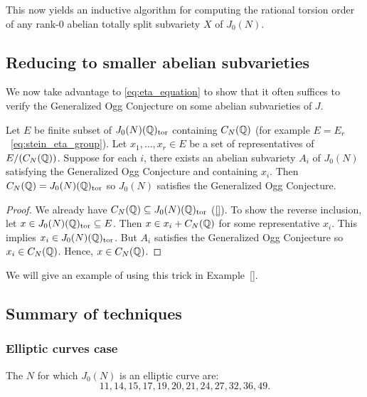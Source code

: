 This now yields an inductive algorithm for computing the rational torsion order
of any rank-0 abelian totally split subvariety $X$ of $J_0(N)$.

\subsection{Reducing to smaller abelian subvarieties}%
\label{sub:reducing_to_smaller_abelian_subvarieties}

We now take advantage to \eqref{eq:eta_equation} to show that it often suffices
to verify the Generalized Ogg Conjecture on some abelian subvarieties of $J$.
\begin{proposition}
    Let $E$ be finite subset of $J_0(N)(\mathbb{Q})_{\mathrm{tor}}$ containing $C_N(\mathbb{Q})$ (for
    example $E=E_r$~\eqref{eq:stein_eta_group}). Let $x_1,\ldots,x_r\in E$ be a
    set of representatives of $E/(C_N(\mathbb{Q}))$. Suppose for each $i$, there
    exists an abelian subvariety $A_i$ of $J_0(N)$ satisfying the Generalized
    Ogg Conjecture and containing $x_i$. Then $C_N(\mathbb{Q})=J_0(N)(\mathbb{Q})_{\mathrm{tor}}$ so
    $J_0(N)$ satisfies the Generalized Ogg Conjecture.
\end{proposition}
\begin{proof}
    We already have $C_N(\mathbb{Q})\subseteq J_0(N)(\mathbb{Q})_{\mathrm{tor}}$ (\ref{}). To show the
    reverse inclusion, let $x\in J_0(N)(\mathbb{Q})_{\mathrm{tor}}\subseteq E$. Then $x\in
    x_i+C_N(\mathbb{Q})$ for some representative $x_i$. This implies $x_i\in
    J_0(N)(\mathbb{Q})_{\mathrm{tor}}$. But $A_i$ satisfies the Generalized Ogg Conjecture so
    $x_i\in C_N(\mathbb{Q})$. Hence, $x\in C_N(\mathbb{Q})$.
\end{proof}

We will give an example of using this trick in Example~\ref{}.

\subsection{Summary of techniques}%
\label{sub:summary_of_techniques} 

\subsubsection{Elliptic curves case}%
\label{ssub:elliptic_curves_case}

\begin{proposition}
    The $N$ for which $J_0(N)$ is an elliptic curve are:
    \[
        11, 14, 15, 17, 19, 20, 21, 24, 27, 32, 36, 49.
    \]
\end{proposition}

